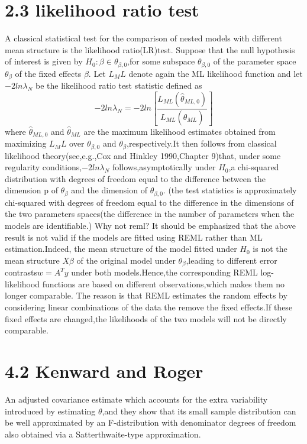 \documentclass[a4paper,11pt]{article}
\begin{document}
\section{2.3 likelihood ratio test}
A classical statistical test for the comparison of nested models with different mean structure is the likelihood ratio(LR)test.
Suppose that the null hypothesis of interest is given by $H_0 :\beta \in \theta_{\beta,0}$,for some subspace $\theta_{\beta,0}$ of the parameter space $\theta_\beta$ of the fixed effects $\beta$.
Let $L_ML$ denote again the ML likelihood function and let $-2ln\lambda_N$ be the likelihood ratio test statistic defined as
\begin{equation}\label{eq:10}
-2ln\lambda_N = -2 ln[\frac{L_{ML}(\widehat{\theta}_{ML,0})}{L_{ML}(\widehat{\theta}_{ML})}]
\end{equation}
where $\widehat{\theta}_{ML,0}$ and $\widehat{\theta}_{ML}$ are the maximum likelihood estimates obtained from maximizing $L_ML$ over $\theta_{\beta,0}$ and $\theta_\beta$,respectively.It then follows from classical likelihood theory(see,e.g.,Cox and Hinkley 1990,Chapter 9)that, under some regularity conditions,$-2ln \lambda_N$ follows,asymptotically under $H_0$,a chi-squared distribution with degrees of freedom equal to the difference between the dimension p of $\theta_\beta$ and the dimension of $\theta_{\beta,0}$.
(the test statistics is approximately chi-squared with degrees of freedom equal to the difference in the dimensions of the two parameters spaces(the difference in the number of parameters when the models are identifiable.)
Why not reml?
It should be emphasized that the above result is not valid if the models are fitted using REML rather than ML estimation.Indeed, the mean structure of the model fitted under $H_0$ is not the mean structure $X\beta$ of the original model under $\theta_\beta$,leading to different error contrasts$w = A^T y$ under both models.Hence,the corresponding REML log-likelihood functions are based on different observations,which makes them no longer comparable.
The reason is that REML estimates the random effects by considering linear combinations of the data the remove the fixed effects.If these fixed effects are changed,the likelihoods of the two models will not be directly comparable.
\section{4.2 Kenward and Roger}
An adjusted covariance estimate which accounts for the extra variability introduced by estimating $\theta$,and they show that its small sample distribution can be well approximated by an F-distribution with denominator degrees of freedom also obtained via a Satterthwaite-type approximation.
\end{document}
